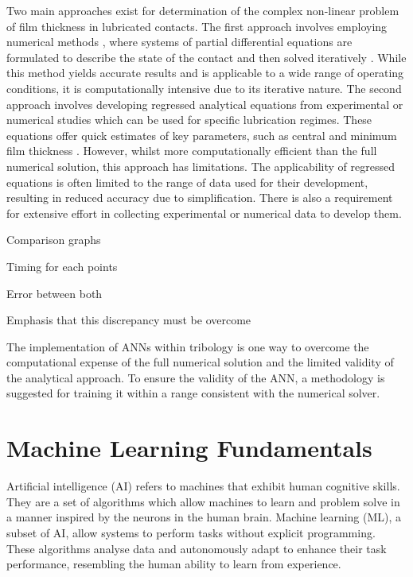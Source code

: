Two main approaches exist for determination of the complex non-linear problem of film thickness in lubricated contacts. The first approach involves employing numerical methods \cite{Dowson1959}, where systems of partial differential equations are formulated to describe the state of the contact and then solved iteratively \cite{Gohar2018}. While this method yields accurate results and is applicable to a wide range of operating conditions, it is computationally intensive due to its iterative nature. The second approach involves developing regressed analytical equations from experimental or numerical studies which can be used for specific lubrication regimes. These equations offer quick estimates of key parameters, such as central \cite{Dowson1979} and minimum film thickness \cite{Dowson1967}. However, whilst more computationally efficient than the full numerical solution, this approach has limitations. 
The applicability of regressed equations is often limited to the range of data used for their development, resulting in reduced accuracy due to simplification. There is also a requirement for extensive effort in collecting experimental or numerical data to develop them. 

Comparison graphs

Timing for each points

Error between both

Emphasis that this discrepancy must be overcome

The implementation of ANNs within tribology is one way to overcome the computational expense of the full numerical solution and the limited validity of the analytical approach.   To ensure the validity of the ANN, a methodology is suggested for training it within a range consistent with the numerical solver.

\section{Machine Learning Fundamentals}

Artificial intelligence (AI) refers to machines that exhibit human cognitive skills. They are a set of algorithms which allow machines to learn and problem solve in a manner inspired by the neurons in the human brain. Machine learning (ML), a subset of AI, allow systems to perform tasks without explicit programming. These algorithms analyse data and autonomously adapt to enhance their task performance, resembling the human ability to learn from experience. 

